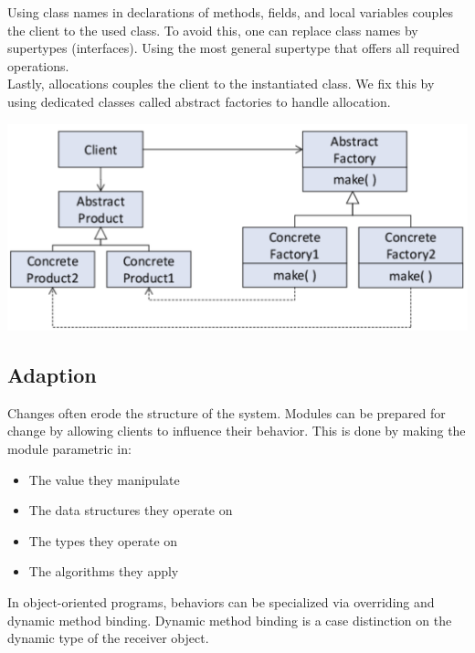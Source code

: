 Using class names in declarations of methods, fields, and local variables couples the client to the used class. To avoid this, one can replace class names by supertypes (interfaces). Using the most general supertype that offers all required operations. \\

Lastly, allocations couples the client to the instantiated class. We fix this by using dedicated classes called abstract factories to handle allocation. 

\begin{center}
	\includegraphics[width=0.7\columnwidth]{assets/factory}
\end{center}


\subsection{Adaption}

Changes often erode the structure of the system. Modules can be prepared for change by allowing clients to influence their behavior. This is done by making the module parametric in:
\begin{itemize}
	\item The value they manipulate
	\item The data structures they operate on
	\item The types they operate on
	\item The algorithms they apply
\end{itemize}

In object-oriented programs, behaviors can be specialized via overriding and dynamic method binding. Dynamic method binding is a case distinction on the dynamic type of the receiver object.